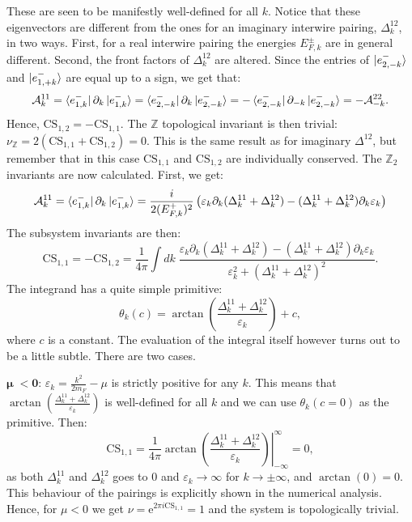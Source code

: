 These are seen to be manifestly well-defined for all $k$. Notice that these eigenvectors are different from the ones for an imaginary interwire pairing, $\Delta^{12}_k$, in two ways. First, for a real interwire pairing the energies $E^{\pm}_{F,k}$ are in general different. Second, the front factors of $\Delta^{12}_k$ are altered. Since the entries of $\ket{e^{-}_{2,-k}}$ and $\ket{e^{-}_{1,+k}}$ are equal up to a sign, we get that:
\begin{equation}
\mathcal{A}^{11}_k = \bra{e^{-}_{1,k}}\partial_k\ket{e^{-}_{1,k}} = \bra{e^{-}_{2,-k}}\partial_k\ket{e^{-}_{2,-k}} = - \bra{e^{-}_{2,-k}}\partial_{-k}\ket{e^{-}_{2,-k}} = -\mathcal{A}^{22}_{-k}. \nonumber
\end{equation}
Hence, $\text{CS}_{1,2} = - \text{CS}_{1,1}$. The $\mathbb{Z}$ topological invariant is then trivial: $\nu_{\mathbb{Z}} = 2(\text{CS}_{1,1} + \text{CS}_{1,2}) = 0$. This is the same result as for imaginary $\Delta^{12}$, but remember that in this case $\text{CS}_{1,1}$ and $\text{CS}_{1,2}$ are individually conserved. The $\mathbb{Z}_2$ invariants are now calculated. First, we get:
\begin{equation}
\mathcal{A}^{11}_k = \bra{e^{-}_{1,k}}\partial_k\ket{e^{-}_{1,k}} = \frac{i}{2(E^{+}_{F,k})^2}\left(\varepsilon_k\partial_k(\Delta^{11}_k + \Delta^{12}_k) - (\Delta^{11}_k + \Delta^{12}_k)\partial_k \varepsilon_k\right) \nonumber
\end{equation}
The subsystem invariants are then:
\begin{equation}
\text{CS}_{1,1} = - \text{CS}_{1,2} = \frac{1}{4\pi}\int dk \; \frac{\varepsilon_k\partial_k(\Delta^{11}_k + \Delta^{12}_k) - (\Delta^{11}_k + \Delta^{12}_k)\partial_k \varepsilon_k}{\varepsilon_k^2 + (\Delta^{11}_k + \Delta^{12}_k)^2}.
\label{eq.CS11integralform}
\end{equation}
The integrand has a quite simple primitive:
\begin{equation}
\theta_k(c) = \arctan\left(\frac{\Delta^{11}_k + \Delta^{12}_k }{\varepsilon_k}\right) + c,
\label{eq.thetak.def}
\end{equation}
where $c$ is a constant. The evaluation of the integral itself however turns out to be a little subtle. There are two cases.

$\boldsymbol\mu \;\mathbf{< 0}$: $\varepsilon_k = \frac{k^2}{2m_F} - \mu$ is strictly positive for any $k$. This means that $\arctan\left(\frac{\Delta^{11}_k + \Delta^{12}_k }{\varepsilon_k}\right)$ is well-defined for all $k$ and we can use $\theta_k(c = 0)$ as the primitive. Then:
\begin{equation}
\text{CS}_{1,1} = \frac{1}{4\pi}\left.\arctan\left(\frac{\Delta^{11}_k + \Delta^{12}_k }{\varepsilon_k}\right)\right|^{\infty}_{-\infty} = 0, \nonumber
\end{equation}
as both $\Delta^{11}_k$ and $\Delta^{12}_k$ goes to $0$ and $\varepsilon_k \to \infty$ for $k\to \pm \infty$, and $\arctan(0) = 0$. This behaviour of the pairings is explicitly shown in the numerical analysis. Hence, for $\mu < 0$ we get $\nu = \text{e}^{2\pi i\text{CS}_{1,1}} = 1$ and the system is topologically trivial. 

